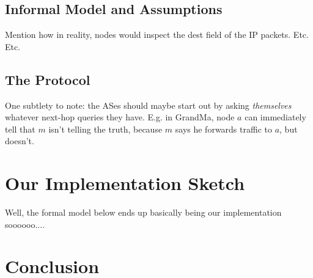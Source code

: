 \documentclass[12pt]{article}
\begin{document}
  \subsection{Informal Model and Assumptions}
    Mention how in reality, nodes would inspect the dest
    field of the IP packets. Etc. Etc.

  \subsection{The Protocol}
    One subtlety to note: the ASes should maybe start out by asking
    \emph{themselves} whatever next-hop queries they have. E.g. in {\sc GrandMa},
    node $a$ can immediately tell that $m$ isn't telling the truth,
    because $m$ says he forwards traffic to $a$, but doesn't.

\section{Our Implementation Sketch}
  Well, the formal model below ends up basically being our implementation
  soooooo....

\section{Conclusion}

{}


\clearpage
\appendix
\end{document}
